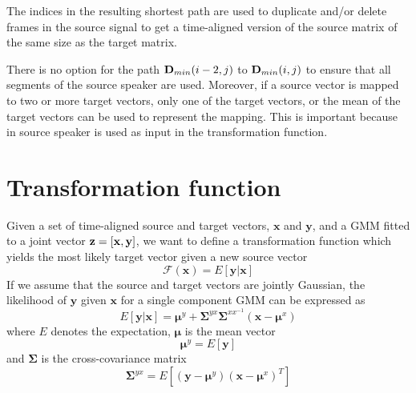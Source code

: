 The indices in the resulting shortest path are used to duplicate and/or delete frames in the source signal to get a time-aligned version of the source matrix of the same size as the target matrix.


\begin{remark}
There is no option for the path $\textbf{D}_{min}(i-2,j)$ to $\textbf{D}_{min}(i,j)$ to ensure that all segments of the source speaker are used. Moreover, if a source vector is mapped to two or more target vectors, only one of the target vectors, or the mean of the target vectors can be used to represent the mapping. This is important because in source speaker is used as input in the transformation function.
\end{remark}

\section{Transformation function} %
\label{sec:transformation_function}
Given a set of time-aligned source and target vectors, $\mathbf{x}$ and $\mathbf{y}$, and a GMM fitted to a joint vector $\mathbf{z}=\left[\mathbf{x},\mathbf{y}\right]$, we want to define a transformation function which yields the most likely target vector given a new source vector
\newcommand{\fff}{\mathcal F}
\begin{equation}
	\fff(\mathbf{x}) = E[\mathbf{y}\vert \mathbf{x}]
\end{equation}
If we assume that the source and target vectors are jointly Gaussian, the likelihood of $\mathbf{y}$ given $\mathbf{x}$ for a single component GMM can be expressed as \cite{kay93}
\begin{equation}
	E[\mathbf{y}\vert \mathbf{x}] = \boldsymbol{\mu}^y + \mathbf{\Sigma}^{yx} \mathbf{\Sigma}^{xx^{-1}} (\mathbf{x}-\boldsymbol{\mu}^x)
\end{equation}
where $E$ denotes the expectation, $\boldsymbol{\mu}$ is the mean vector
\begin{equation}
	\boldsymbol{\mu}^y = E[\mathbf{y}]
\end{equation}
and $\mathbf{\Sigma}$ is the cross-covariance matrix
\begin{equation}
	\mathbf{\Sigma}^{yx} = E[(\mathbf{y}-\boldsymbol{\mu}^y)(\mathbf{x}-\boldsymbol{\mu}^x)^T]
\end{equation}

